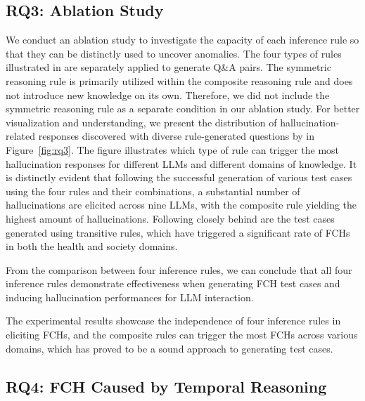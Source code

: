 \subsection{RQ3: Ablation Study}
We conduct an ablation study to investigate the capacity of each inference rule so that they can be distinctly used to uncover anomalies.
The four types of rules illustrated in  are separately applied to generate Q\&A pairs. The symmetric reasoning rule is primarily utilized within the composite reasoning rule and does not introduce new knowledge on its own. Therefore, we did not include the symmetric reasoning rule as a separate condition in our ablation study.
For better visualization and understanding, we present the distribution of hallucination-related responses discovered with diverse rule-generated questions by \tool in Figure~\ref{fig:rq3}. The figure illustrates which type of rule can trigger the most hallucination responses for different LLMs and different domains of knowledge. It is distinctly evident that following the successful generation of various test cases using the four rules and their combinations, a substantial number of hallucinations are elicited across nine LLMs, with the composite rule yielding the highest amount of hallucinations. Following closely behind are the test cases generated using transitive rules, which have triggered a significant rate of FCHs in both the health and society domains.

From the comparison between four inference rules, we can conclude that all four inference rules demonstrate effectiveness when generating FCH test cases and inducing hallucination performances for LLM interaction.



\begin{tcolorbox}[title=ANSWER to RQ3, boxrule=0.8pt,boxsep=1.5pt,left=2pt,right=2pt,top=2pt,bottom=2pt]
The experimental results showcase the independence of four inference rules in eliciting FCHs, and the composite rules can trigger the most FCHs across various domains, which has proved to be a sound approach to generating test cases. 
\end{tcolorbox} 



\subsection{RQ4: FCH Caused by Temporal Reasoning} 

